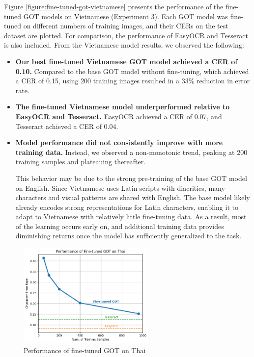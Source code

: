 \documentclass[12pt,oneside]{memoir}
\begin{document}
Figure \ref{figure:fine-tuned-got-vietnamese} presents the performance of the fine-tuned GOT models on Vietnamese (Experiment 3). 
Each GOT model was fine-tuned on different numbers of training images, and their CERs on the test dataset are plotted.
For comparison, the performance of EasyOCR and Tesseract is also included.
From the Vietnamese model results, we observed the following:

\begin{itemize}
    \item \textbf{Our best fine-tuned Vietnamese GOT model achieved a CER of 0.10.}
    Compared to the base GOT model without fine-tuning, which achieved a CER of 0.15, using 200 training images resulted in a 33\% reduction in error rate.
    \item \textbf{The fine-tuned Vietnamese model underperformed relative to EasyOCR and Tesseract.} EasyOCR achieved a CER of 0.07, and Tesseract achieved a CER of 0.04.
    \item \textbf{Model performance did not consistently improve with more training data.} 
    Instead, we observed a non-monotonic trend, peaking at 200 training samples and plateauing thereafter.

    This behavior may be due to the strong pre-training of the base GOT model on English.
    Since Vietnamese uses Latin scripts with diacritics, many characters and visual patterns are shared with English.
    The base model likely already encodes strong representations for Latin characters, enabling it to adapt to Vietnamese with relatively little fine-tuning data.
    As a result, most of the learning occurs early on, and additional training data provides diminishing returns once the model has sufficiently generalized to the task.
\end{itemize}

\begin{figure}[ht]
    \centering
    \includegraphics[width=0.6\textwidth]{images/fine-tuned-got-thai.png}
    \caption{Performance of fine-tuned GOT on Thai}
    \label{figure:fine-tuned-got-thai}
\end{figure}
\end{document}
